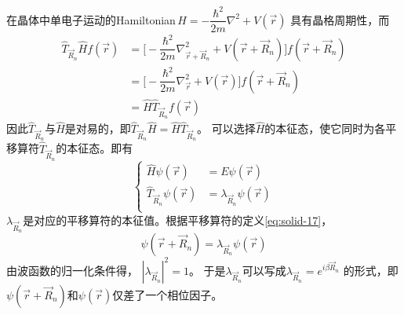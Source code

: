 在晶体中单电子运动的Hamiltonian\,$\hat H=-\dfrac{\hbar^2}{2m}\nabla^2+V(\vec r)$
具有晶格周期性，而
\begin{equation}
  \begin{split}
  \hat T_{\vec R_n}\hat Hf(\vec r)&=\biggl[-\dfrac{\hbar^2}{2m}\nabla_{\vec r +\vec R_n}^2+V(\vec r+\vec R_n)\biggr]f(\vec r+\vec R_n)\\
  &=\biggl[-\dfrac{\hbar^2}{2m}\nabla_{\vec r}^2+V(\vec r)\biggr]f(\vec r+\vec R_n)\\
  &=\hat H\hat T_{\vec R_n}f(\vec r)
  \end{split}
  \label{eq:solid-19}
\end{equation}
因此$\hat T_{\vec R_n}$与$\hat H$是对易的，即$\hat T_{\vec R_n}\hat H=\hat H\hat T_{\vec R_n}$。
可以选择$\hat H$的本征态，使它同时为各平移算符$\hat T_{\vec R_n}$的本征态。即有
\begin{equation} \label{eq:solid-21}
\left\{ \begin{aligned}
  \hat H\psi(\vec r)&=E\psi(\vec r) \\
  \hat T_{\vec R_n}\psi(\vec r)&=\lambda_{\vec R_n}\psi(\vec r) \\
\end{aligned} \right.
\end{equation}
$\lambda_{\vec R_n}$是对应的平移算符的本征值。根据平移算符的定义\eqref{eq:solid-17}，
\begin{equation}
  \psi(\vec r+\vec R_n)=\lambda_{\vec R_n}\psi(\vec r)
  \label{eq:solid-22}
\end{equation}
由波函数的归一化条件得，%
$|\lambda_{\vec R_n}|^2=1$。
于是$\lambda_{\vec R_n}$可以写成$\lambda_{\vec R_n}=e^{i\beta\vec R_n}$
的形式，即$\psi(\vec r+\vec R_n)$和$\psi(\vec r)$仅差了一个相位因子。


